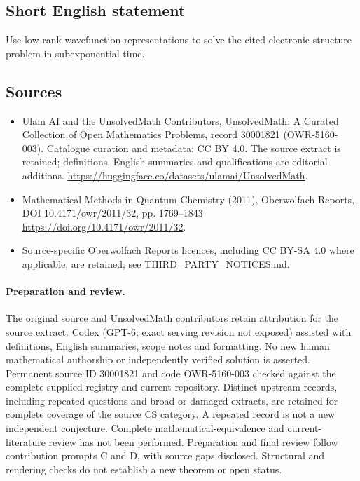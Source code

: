 \documentclass[11pt]{article}
\begin{document}
\subsection{Short English statement}
Use low-rank wavefunction representations to solve the cited electronic-structure problem in subexponential time.
\subsection{Sources}
\begin{itemize}
\item[\hypertarget{source:30001821:1}{S1}] Ulam AI and the UnsolvedMath Contributors, UnsolvedMath: A Curated Collection of Open Mathematics Problems, record 30001821 (OWR-5160-003). Catalogue curation and metadata: CC BY 4.0. The source extract is retained; definitions, English summaries and qualifications are editorial additions.
\url{https://huggingface.co/datasets/ulamai/UnsolvedMath}.
\item[\hypertarget{source:30001821:2}{S2}] Mathematical Methods in Quantum Chemistry (2011), Oberwolfach Reports, DOI 10.4171/owr/2011/32, pp. 1769--1843
\url{https://doi.org/10.4171/owr/2011/32}.
\item Source-specific Oberwolfach Reports licences, including CC BY-SA 4.0 where applicable, are retained; see THIRD\_PARTY\_NOTICES.md.
\end{itemize}
\paragraph{Preparation and review.}
The original source and UnsolvedMath contributors retain attribution for the source extract. Codex (GPT-6; exact serving revision not exposed) assisted with definitions, English summaries, scope notes and formatting. No new human mathematical authorship or independently verified solution is asserted. Permanent source ID 30001821 and code OWR-5160-003 checked against the complete supplied registry and current repository. Distinct upstream records, including repeated questions and broad or damaged extracts, are retained for complete coverage of the source CS category. A repeated record is not a new independent conjecture. Complete mathematical-equivalence and current-literature review has not been performed. Preparation and final review follow contribution prompts C and D, with source gaps disclosed. Structural and rendering checks do not establish a new theorem or open status.
\label{end:30001821}
\end{document}
